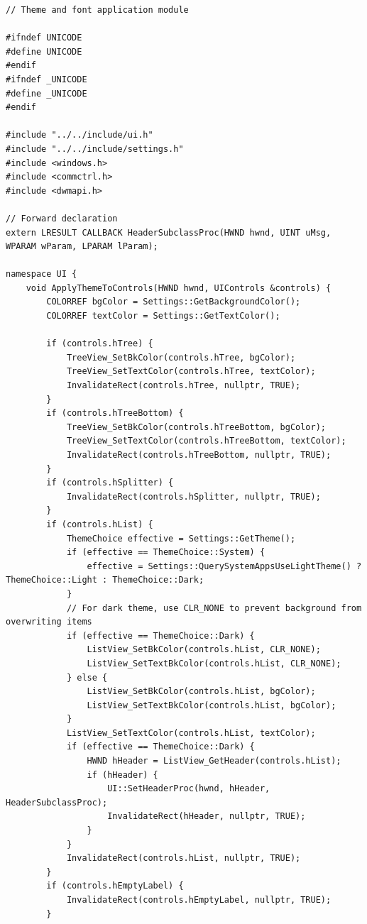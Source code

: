 \begin{lstlisting}[style=CodeListing]
// Theme and font application module

#ifndef UNICODE
#define UNICODE
#endif
#ifndef _UNICODE
#define _UNICODE
#endif

#include "../../include/ui.h"
#include "../../include/settings.h"
#include <windows.h>
#include <commctrl.h>
#include <dwmapi.h>

// Forward declaration
extern LRESULT CALLBACK HeaderSubclassProc(HWND hwnd, UINT uMsg, WPARAM wParam, LPARAM lParam);

namespace UI {
    void ApplyThemeToControls(HWND hwnd, UIControls &controls) {
        COLORREF bgColor = Settings::GetBackgroundColor();
        COLORREF textColor = Settings::GetTextColor();
        
        if (controls.hTree) {
            TreeView_SetBkColor(controls.hTree, bgColor);
            TreeView_SetTextColor(controls.hTree, textColor);
            InvalidateRect(controls.hTree, nullptr, TRUE);
        }
        if (controls.hTreeBottom) {
            TreeView_SetBkColor(controls.hTreeBottom, bgColor);
            TreeView_SetTextColor(controls.hTreeBottom, textColor);
            InvalidateRect(controls.hTreeBottom, nullptr, TRUE);
        }
        if (controls.hSplitter) {
            InvalidateRect(controls.hSplitter, nullptr, TRUE);
        }
        if (controls.hList) {
            ThemeChoice effective = Settings::GetTheme();
            if (effective == ThemeChoice::System) {
                effective = Settings::QuerySystemAppsUseLightTheme() ? ThemeChoice::Light : ThemeChoice::Dark;
            }
            // For dark theme, use CLR_NONE to prevent background from overwriting items
            if (effective == ThemeChoice::Dark) {
                ListView_SetBkColor(controls.hList, CLR_NONE);
                ListView_SetTextBkColor(controls.hList, CLR_NONE);
            } else {
                ListView_SetBkColor(controls.hList, bgColor);
                ListView_SetTextBkColor(controls.hList, bgColor);
            }
            ListView_SetTextColor(controls.hList, textColor);
            if (effective == ThemeChoice::Dark) {
                HWND hHeader = ListView_GetHeader(controls.hList);
                if (hHeader) {
                    UI::SetHeaderProc(hwnd, hHeader, HeaderSubclassProc);
                    InvalidateRect(hHeader, nullptr, TRUE);
                }
            }
            InvalidateRect(controls.hList, nullptr, TRUE);
        }
        if (controls.hEmptyLabel) {
            InvalidateRect(controls.hEmptyLabel, nullptr, TRUE);
        }
        

\end{lstlisting}
